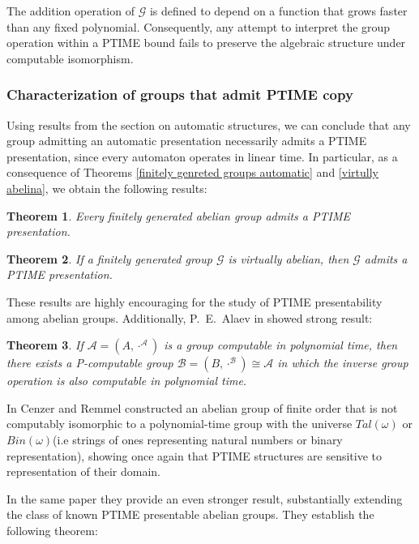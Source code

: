 \documentclass{pracalicmgr2025}
\theoremstyle{plain}            %
\newtheorem{theorem}{Theorem}[chapter]
\theoremstyle{remark}           %
\theoremstyle{definition}       %
\begin{document}
The addition operation of $\mathcal{G}$ is defined to depend on a function that grows faster than any fixed polynomial. Consequently, any attempt to interpret the group operation within a PTIME bound fails to preserve the algebraic structure under computable isomorphism.
\subsubsection{Characterization of groups that admit PTIME copy}


\medskip
Using results from the section on automatic structures, we can conclude that any group admitting an automatic presentation necessarily admits a PTIME presentation, since every automaton operates in linear time. In particular, as a consequence of Theorems \ref{finitely genreted groups automatic} and \ref{virtully abelina}, we obtain the following results:

\begin{theorem}
    Every finitely generated abelian group admits a PTIME presentation.
\end{theorem}

\begin{theorem}
    If a finitely generated group $\mathcal{G}$ is virtually abelian, then $\mathcal{G}$ admits a PTIME presentation.   
\end{theorem}

These results are highly encouraging for the study of PTIME presentability among abelian groups. Additionally, P.\ E.\ Alaev in \cite{Alaev2023} showed strong result: 
\begin{theorem}
    If $\mathcal{A} = (A, \cdot ^{\mathcal{A}})$ is a group computable in polynomial time, then there exists a P-computable group $\mathcal{B} = (B, \cdot ^\mathcal{B}) \cong \mathcal{A} $ in which the inverse group operation is also computable in polynomial time.
\end{theorem}

In \cite{cenzer1992polynomial} Cenzer and Remmel constructed an abelian group of finite order that is not computably isomorphic to a polynomial-time group with the universe $Tal(\omega)$ or $Bin(\omega)$(i.e strings of ones representing natural numbers or binary representation), showing once again that PTIME structures are sensitive to representation of their domain.  


In the same paper they provide an even stronger result, substantially extending the class of known PTIME presentable abelian groups. They establish the following theorem:
\end{document}
